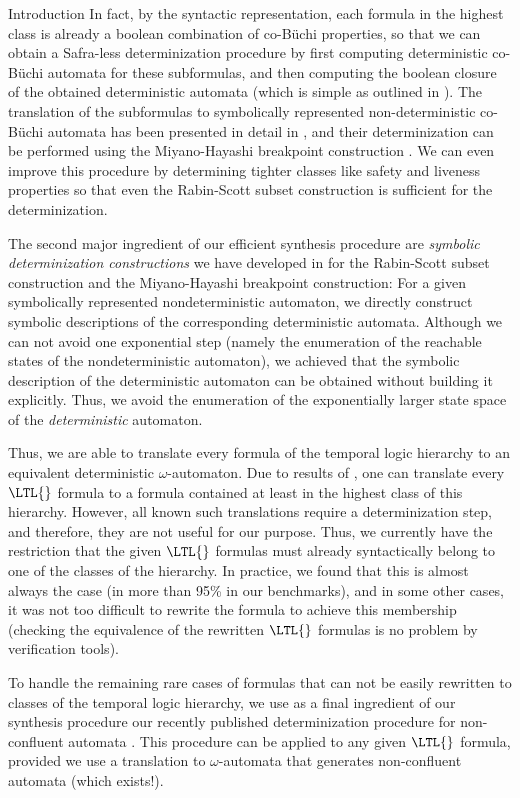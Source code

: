 \documentclass[copyright,creativecommons]{eptcs}
\begin{document}
\begin{section}{Introduction}
In fact, by the syntactic representation, each formula in the highest class is already a boolean combination of co-Büchi properties, so that we can obtain a Safra-less determinization procedure by first computing deterministic co-Büchi automata for these subformulas, and then computing the boolean closure of the obtained deterministic automata (which is simple as outlined in \cite{Schn03}). The translation of the subformulas to symbolically represented non-deterministic co-Büchi automata has been presented in detail in \cite{Schn01b,Schn03}, and their determinization can be performed using the Miyano-Hayashi breakpoint construction \cite{MiHa84,Schn03}. We can even improve this procedure by determining tighter classes like safety and liveness properties so that even the Rabin-Scott subset construction is sufficient for the determinization.

The second major ingredient of our efficient synthesis procedure are \emph{symbolic determinization constructions} we have developed in \cite{MoSL08} for the Rabin-Scott subset construction \cite{RaSc59} and the Miyano-Hayashi breakpoint construction: For a given symbolically represented nondeterministic automaton, we directly construct symbolic descriptions of the corresponding deterministic automata. Although we can not avoid one exponential step (namely the enumeration of the reachable states of the nondeterministic automaton), we achieved that the symbolic description of the deterministic automaton can be obtained without building it explicitly. Thus, we avoid the enumeration of the exponentially larger state space of the \emph{deterministic} automaton.

Thus, we are able to translate every formula of the temporal logic hierarchy to an equivalent deterministic $\omega$-automaton. Due to results of \cite{ChMP92}, one can translate every $\LTL{}$ formula to a formula contained at least in the highest class of this hierarchy. However, all known such translations require a determinization step, and therefore, they are not useful for our purpose. Thus, we currently have the restriction that the given $\LTL{}$ formulas must already syntactically belong to one of the classes of the hierarchy. In practice, we found that this is almost always the case (in more than 95\% in our benchmarks), and in some other cases, it was not too difficult to rewrite the formula to achieve this membership (checking the equivalence of the rewritten $\LTL{}$ formulas is no problem by verification tools).

To handle the remaining rare cases of formulas that can not be easily rewritten to classes of the temporal logic hierarchy, we use as a final ingredient of our synthesis procedure our recently published determinization procedure for non-confluent automata \cite{MoSc08}. This procedure can be applied to any given $\LTL{}$ formula, provided we use a translation to $\omega$-automata that generates non-confluent automata (which exists!).


\end{section}
\end{document}
